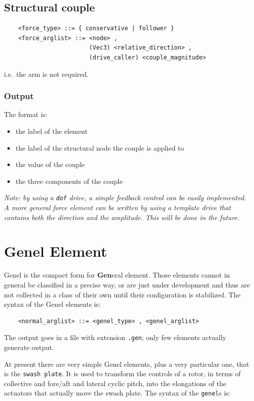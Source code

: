 \subsection{Structural couple}
\begin{verbatim}
    <force_type> ::= { conservative | follower } 
    <force_arglist> ::= <node> ,
                        (Vec3) <relative_direction> ,  
                        (drive_caller) <couple_magnitude>
\end{verbatim}
i.e.\ the arm is not required. 

\subsubsection{Output}
The format is:
\begin{itemize}
    \item the label of the element
    \item the label of the structural node the couple is applied to
    \item the value of the couple
    \item the three components of the couple
\end{itemize}


\noindent
{\em 
Note: by using a \texttt{dof} drive, a simple feedback control can be easily
implemented. \\
A more general force element can be written by using a template drive
that contains both the direction and the amplitude. This will be done in the
future. 
}





\section{Genel Element}
{\sc Genel} is the compact form for {\sc \bf Gen}eral {\sc el}ement. Those
elements cannot in general be classified in a precise way, or are just
under development and thus are not collected in a class of their own until
their configuration is stabilized. 
The syntax of the {\sc Genel} elements is:
\begin{verbatim}
    <normal_arglist> ::= <genel_type> , <genel_arglist>
\end{verbatim}

\noindent
The output goes in a file with extension \texttt{.gen}; only few elements
actually generate output.

\noindent
At present there are very simple {\sc Genel}
elements, plus a very particular one, that is the \texttt{swash plate}.
It is used to transform the controls of a rotor, in terms of collective
and fore/aft and lateral cyclic pitch, into the elongations of the actuators 
that actually move the swash plate.
The syntax of the \texttt{genel}s is:

